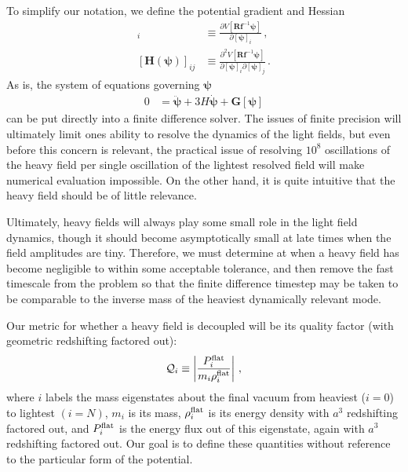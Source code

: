\documentclass{article}
\begin{document}
To simplify our notation, we define the potential gradient and Hessian
\begin{align}
    [\bm G(\bm\psi)]_i&\equiv \frac{\partial V[{\bm R}{\bm f}^{-1}{\bm \psi}]}{\partial{[\bm \psi]_i}}\,,\\
    [\bm H(\bm\psi)]_{ij}&\equiv \frac{\partial^2 V[{\bm R}{\bm f}^{-1}{\bm \psi}]}{\partial{[\bm \psi]_i}\partial{[\bm \psi]_j}}\,.
\end{align}
As is, the system of equations governing $\bm\psi$
\begin{align}
    0&=\ddot{\bm\psi} + 3 H\dot{\bm\psi} + \bm G[{\bm\psi}]
\end{align}
can be put directly into a finite difference solver. The issues of finite precision will ultimately limit ones ability to resolve the dynamics of the light fields, but even before this concern is relevant, the practical issue of resolving $10^8$ oscillations of the heavy field per single oscillation of the lightest resolved field will make numerical evaluation impossible. On the other hand, it is quite intuitive that the heavy field should be of little relevance. 

Ultimately, heavy fields will always play some small role in the light field dynamics, though it should become asymptotically small at late times when the field amplitudes are tiny. Therefore, we must determine at when a heavy field has become negligible to within some acceptable tolerance, and then remove the fast timescale from the problem so that the finite difference timestep may be taken to be comparable to the inverse mass of the heaviest dynamically relevant mode.

Our metric for whether a heavy field is decoupled will be its quality factor (with geometric redshifting factored out):
\begin{align}
    {\cal Q}_i\equiv \left|\frac{P_i^{\rm flat}}{m_i\rho_i^{\rm flat}}\right|\,,
\end{align}
where $i$ labels the mass eigenstates about the final vacuum from heaviest ($i = 0$) to lightest $(i = N)$, $m_i$ is its mass, $\rho_i^{\rm flat}$ is its energy density with $a^3$ redshifting factored out, and $P_i^{\rm flat}$ is the energy flux out of this eigenstate, again with $a^3$ redshifting factored out. Our goal is to define these quantities without reference to the particular form of the potential.
\end{document}
